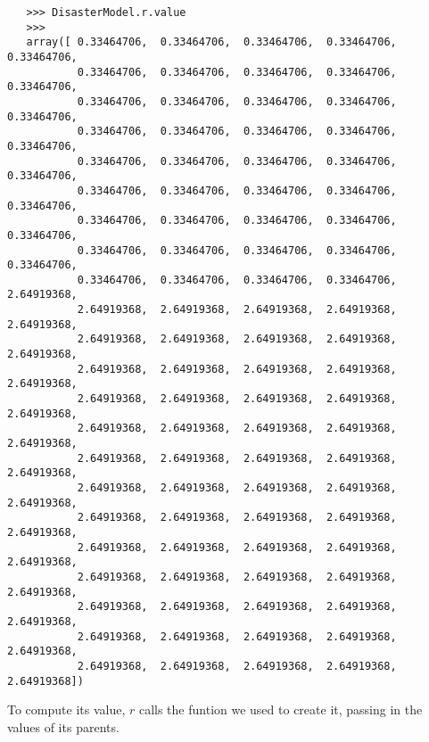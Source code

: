 \begin{verbatim}
   >>> DisasterModel.r.value
   >>>
   array([ 0.33464706,  0.33464706,  0.33464706,  0.33464706,  0.33464706,
           0.33464706,  0.33464706,  0.33464706,  0.33464706,  0.33464706,
           0.33464706,  0.33464706,  0.33464706,  0.33464706,  0.33464706,
           0.33464706,  0.33464706,  0.33464706,  0.33464706,  0.33464706,
           0.33464706,  0.33464706,  0.33464706,  0.33464706,  0.33464706,
           0.33464706,  0.33464706,  0.33464706,  0.33464706,  0.33464706,
           0.33464706,  0.33464706,  0.33464706,  0.33464706,  0.33464706,
           0.33464706,  0.33464706,  0.33464706,  0.33464706,  0.33464706,
           0.33464706,  0.33464706,  0.33464706,  0.33464706,  2.64919368,
           2.64919368,  2.64919368,  2.64919368,  2.64919368,  2.64919368,
           2.64919368,  2.64919368,  2.64919368,  2.64919368,  2.64919368,
           2.64919368,  2.64919368,  2.64919368,  2.64919368,  2.64919368,
           2.64919368,  2.64919368,  2.64919368,  2.64919368,  2.64919368,
           2.64919368,  2.64919368,  2.64919368,  2.64919368,  2.64919368,
           2.64919368,  2.64919368,  2.64919368,  2.64919368,  2.64919368,
           2.64919368,  2.64919368,  2.64919368,  2.64919368,  2.64919368,
           2.64919368,  2.64919368,  2.64919368,  2.64919368,  2.64919368,
           2.64919368,  2.64919368,  2.64919368,  2.64919368,  2.64919368,
           2.64919368,  2.64919368,  2.64919368,  2.64919368,  2.64919368,
           2.64919368,  2.64919368,  2.64919368,  2.64919368,  2.64919368,
           2.64919368,  2.64919368,  2.64919368,  2.64919368,  2.64919368,
           2.64919368,  2.64919368,  2.64919368,  2.64919368,  2.64919368])
\end{verbatim}
To compute its value, $r$ calls the funtion we used to create it, passing in the values of its parents.

